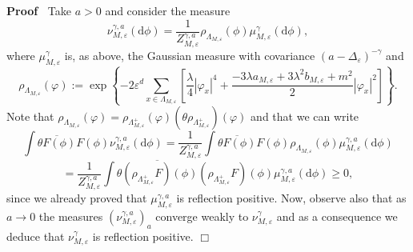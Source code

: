 \documentclass[a4paper,11pt]{article}
\newcommand{\assign}{:=}
\newcommand{\mathd}{\mathrm{d}}
\newenvironment{proof}{\noindent\textbf{Proof\ }}{\hspace*{\fill}$\Box$\medskip}
\numberwithin{equation}{section}
\begin{document}
\begin{proof}
  Take $a > 0$ and consider the measure
  \[ \nu_{M, \varepsilon}^{\gamma, a} (\mathd \phi) = \frac{1}{Z^{\gamma,
     a}_{M, \varepsilon}} \rho_{\Lambda_{M, \varepsilon}} (\phi) \mu_{M,
     \varepsilon}^{\gamma} (\mathd \phi), \]
  where $\mu_{M, \varepsilon}^{\gamma}$ is, as above, the Gaussian measure with
  covariance $(a - \Delta_{\varepsilon})^{- \gamma}$ and
  \[ \rho_{\Lambda_{M, \varepsilon}} (\varphi) \assign \exp \left\{ - 2
     \varepsilon^d  \sum_{x \in \Lambda_{M, \varepsilon}} \left[
     \frac{\lambda}{4} | \varphi_x |^4 + \frac{- 3 \lambda a_{M, \varepsilon}
     + 3 \lambda^2 b_{M, \varepsilon} + m^2}{2} | \varphi_x |^2 \right]
     \right\} . \]
  Note that $\rho_{\Lambda_{M, \varepsilon}} (\varphi) = \rho_{\Lambda_{M,
  \varepsilon}^+} (\varphi) (\theta \rho_{\Lambda_{M, \varepsilon}^+})
  (\varphi)$ and that we can write
  \[ \int \overline{\theta F (\phi)} F (\phi) \nu_{M, \varepsilon}^{\gamma, a}
     (\mathd \phi) = \frac{1}{Z^{\gamma, a}_{M, \varepsilon}} \int
     \overline{\theta F (\phi)} F (\phi) \rho_{\Lambda_{M, \varepsilon}}
     (\phi) \mu_{M, \varepsilon}^{\gamma, a} (\mathd \phi) \]
  \[ = \frac{1}{Z^{\gamma, a}_{M, \varepsilon}} \int \overline{\theta
     (\rho_{\Lambda_{M, \varepsilon}^+} F) (\phi)} (\rho_{\Lambda_{M,
     \varepsilon}^+} F) (\phi) \mu_{M, \varepsilon}^{\gamma, a} (\mathd \phi)
     \geqslant 0, \]
  since we already proved that $\mu_{M, \varepsilon}^{\gamma, a}$ is
  reflection positive. Now, observe also that as $a \rightarrow 0$ the measures
  $(\nu_{M, \varepsilon}^{\gamma, a})_a$ converge weakly to $\nu_{M,
  \varepsilon}^{\gamma}$ and as a consequence we deduce that $\nu_{M,
  \varepsilon}^{\gamma}$ is reflection positive.
\end{proof}
\end{document}
